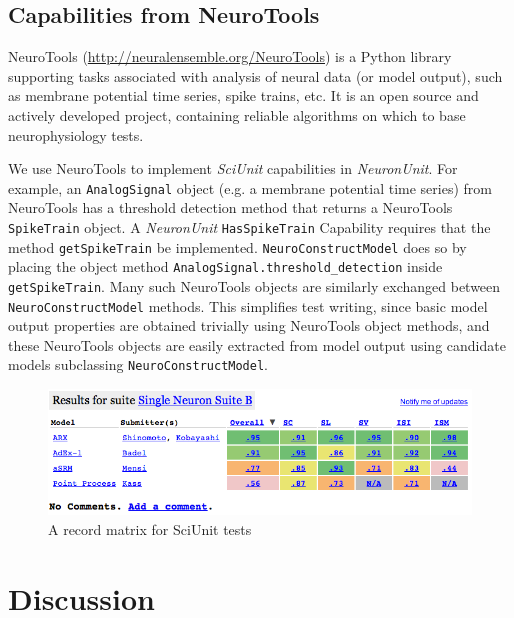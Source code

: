 \documentclass{frontiersSCNS}
\let\verbx\lstinline
\begin{document}
\subsection{Capabilities from NeuroTools}
NeuroTools (\url{http://neuralensemble.org/NeuroTools}) is a Python library supporting tasks associated with analysis of neural data (or model output), such as membrane potential time series, spike trains, etc. 
It is an open source and actively developed project, containing reliable algorithms on which to base neurophysiology tests.

We use NeuroTools to implement \textit{SciUnit} capabilities in \textit{NeuronUnit}. 
For example, an \verbx{AnalogSignal} object (e.g. a membrane potential time series) from NeuroTools has a threshold detection method that returns a NeuroTools \verbx{SpikeTrain} object. 
A \textit{NeuronUnit} \verbx{HasSpikeTrain} Capability requires that the method \verbx{getSpikeTrain} be implemented. 
\verbx{NeuroConstructModel} does so by placing the object method \verbx{AnalogSignal.threshold_detection} inside \verbx{getSpikeTrain}. 
Many such NeuroTools objects are similarly exchanged between \verbx{NeuroConstructModel} methods. 
This simplifies test writing, since basic model output properties are obtained trivially using NeuroTools object methods, and these NeuroTools objects are easily extracted from model output using candidate models subclassing \verbx{NeuroConstructModel}.  


\begin{figure}%
\includegraphics[scale=0.65]{table.png}
\caption{A record matrix for SciUnit tests}
\label{fig:scidash_matrix}
\vspace{-25px}
\end{figure}
\vspace{-10px}
\leavevmode
\section{Discussion}\label{sec:discussion}
\end{document}
